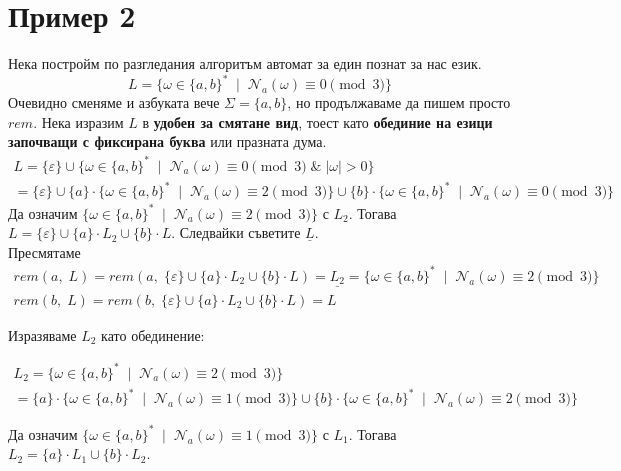 \documentclass[12pt]{article}
\begin{document}
\section{Пример 2}
Нека постройм по разгледания алгоритъм автомат за един познат за нас език.
\[L = \{\omega \in \{a, b\}^* \; \mid \; \mathcal{N}_{a}(\omega) \equiv 0 \pmod{3}\}\]
Очевидно сменяме и азбуката вече \(\Sigma = \{a, b\}\), но продължаваме да пишем просто \(rem\).
Нека изразим \(L\) в \textbf{удобен за смятане вид}, тоест като \textbf{обединие на езици започващи с фиксирана буква} или празната дума.
\begin{align*}
    L = \{\varepsilon\} \cup \{\omega \in \{a, b\}^* \; \mid \; \mathcal{N}_{a}(\omega) \equiv 0 \pmod{3} \; \& \; |\omega| > 0\} \\
    = \{\varepsilon\}
\cup
\{a\} \cdot \{\omega \in \{a, b\}^* \; \mid \; \mathcal{N}_{a}(\omega) \equiv 2 \pmod{3}\}
\cup
\{b\} \cdot \{\omega \in \{a, b\}^* \; \mid \; \mathcal{N}_{a}(\omega) \equiv 0 \pmod{3}\}
\end{align*}
Да означим \(\{\omega \in \{a, b\}^* \; \mid \; \mathcal{N}_{a}(\omega) \equiv 2 \pmod{3}\}\) с \(L_2\).
Тогава \(L = \{\varepsilon\} \cup \{a\} \cdot L_2 \cup \{b\} \cdot L\).
Следвайки съветите \(\boxed{\underline{L}}\). \\

\vspace{2mm}
Пресмятаме
\begin{align*}
    rem(a, \; L) = rem(a, \; \{\varepsilon\} \cup \{a\} \cdot L_2 \cup \{b\} \cdot L) = \underline{L_2} = \{\omega \in \{a, b\}^* \; \mid \; \mathcal{N}_{a}(\omega) \equiv 2 \pmod{3}\} \\
    rem(b, \; L) = rem(b, \; \{\varepsilon\} \cup \{a\} \cdot L_2 \cup \{b\} \cdot L) = L
\end{align*}

Изразяваме \(L_2\) като обединение:

\begin{align*}
    L_2 = \{\omega \in \{a, b\}^* \; \mid \; \mathcal{N}_{a}(\omega) \equiv 2 \pmod{3}\} \\
= \{a\} \cdot \{\omega \in \{a, b\}^* \; \mid \; \mathcal{N}_{a}(\omega) \equiv 1 \pmod{3}\} 
\cup \{b\} \cdot \{\omega \in \{a, b\}^* \; \mid \; \mathcal{N}_{a}(\omega) \equiv 2 \pmod{3}\}
\end{align*}

Да означим \(\{\omega \in \{a, b\}^* \; \mid \; \mathcal{N}_{a}(\omega) \equiv 1 \pmod{3}\}\) с \(L_1\). Тогава \(L_2 = \{a\} \cdot L_1 \cup \{b\} \cdot L_2\).  \\
\end{document}
